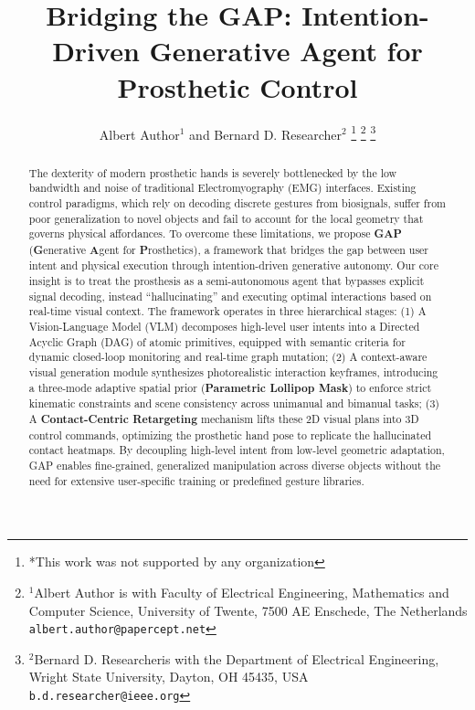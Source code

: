 \documentclass[letterpaper, 10 pt, conference]{ieeeconf}  %
\title{\LARGE \bf
Bridging the GAP: Intention-Driven Generative Agent for Prosthetic Control
}
\author{Albert Author$^{1}$ and Bernard D. Researcher$^{2}$%
\thanks{*This work was not supported by any organization}%
\thanks{$^{1}$Albert Author is with Faculty of Electrical Engineering, Mathematics and Computer Science,
        University of Twente, 7500 AE Enschede, The Netherlands
        {\tt\small albert.author@papercept.net}}%
\thanks{$^{2}$Bernard D. Researcheris with the Department of Electrical Engineering, Wright State University,
        Dayton, OH 45435, USA
        {\tt\small b.d.researcher@ieee.org}}%
}
\begin{document}
\maketitle
\thispagestyle{empty}
\pagestyle{empty}


\begin{abstract}
The dexterity of modern prosthetic hands is severely bottlenecked by the low bandwidth and noise of traditional Electromyography (EMG) interfaces. Existing control paradigms, which rely on decoding discrete gestures from biosignals, suffer from poor generalization to novel objects and fail to account for the local geometry that governs physical affordances. 
To overcome these limitations, we propose \textbf{GAP} (\textbf{G}enerative \textbf{A}gent for \textbf{P}rosthetics), a framework that bridges the gap between user intent and physical execution through intention-driven generative autonomy. 
Our core insight is to treat the prosthesis as a semi-autonomous agent that bypasses explicit signal decoding, instead ``hallucinating'' and executing optimal interactions based on real-time visual context. 
The framework operates in three hierarchical stages: 
(1) A Vision-Language Model (VLM) decomposes high-level user intents into a Directed Acyclic Graph (DAG) of atomic primitives, equipped with semantic criteria for dynamic closed-loop monitoring and real-time graph mutation; 
(2) A context-aware visual generation module synthesizes photorealistic interaction keyframes, introducing a three-mode adaptive spatial prior (\textbf{Parametric Lollipop Mask}) to enforce strict kinematic constraints and scene consistency across unimanual and bimanual tasks; 
(3) A \textbf{Contact-Centric Retargeting} mechanism lifts these 2D visual plans into 3D control commands, optimizing the prosthetic hand pose to replicate the hallucinated contact heatmaps. 
By decoupling high-level intent from low-level geometric adaptation, GAP enables fine-grained, generalized manipulation across diverse objects without the need for extensive user-specific training or predefined gesture libraries.
\end{abstract}

\end{document}
